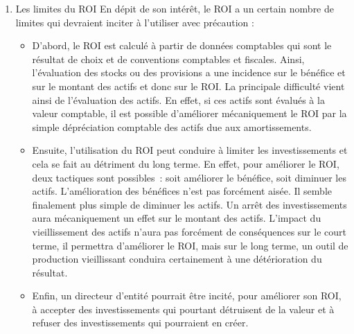 \documentclass{tufte-handout}
\begin{document}
\begin{enumerate}
En résumé, le ROI synthétise "la performance financière des managers ayant la charge de faire face au marché, et maîtrisant pour cela les paramètres qui déterminent les ventes, les coûts et l'actif du bilan"\footnote{Bouquin, H (2010), Le contrôle de gestion, PUF, 8ᵉ édition.\\}. Il permet aussi de transformer l'entreprise en un vaste marché financier interne permettant à la direction d'allouer des ressources aux projets dont les ambitions et la logique financière leur conviennent ; il permet aux dirigeants de garder le contrôle par la logique financière. Il est, en outre, un langage commun assez compréhensible pour l'ensemble de la hiérarchie.\\

Il peut, de plus, être relié directement aux attentes des actionnaires et à la rentabilité financière (que l'on nomme en général ROE : \emph{Return on Equity}), par l'intermédiaire de l'effet de levier, notion que vous verrez dans le cours de finance.\\
\item Les limites du ROI
\label{sec:orga70a6db}
En dépit de son intérêt, le ROI a un certain nombre de limites qui devraient inciter à l'utiliser avec précaution :\\
\begin{itemize}
\item D'abord, le ROI est calculé à partir de données comptables qui sont le résultat de choix et de conventions comptables et fiscales. Ainsi, l'évaluation des stocks ou des provisions a une incidence sur le bénéfice et sur le montant des actifs et donc sur le ROI. La principale difficulté vient ainsi de l'évaluation des actifs. En effet, si ces actifs sont évalués à la valeur comptable, il est possible d'améliorer mécaniquement le ROI par la simple dépréciation comptable des actifs due aux amortissements.\\
\item Ensuite, l'utilisation du ROI peut conduire à limiter les investissements et cela se fait au détriment du long terme. En effet, pour améliorer le ROI, deux tactiques sont possibles : soit améliorer le bénéfice, soit diminuer les actifs. L'amélioration des bénéfices n'est pas forcément aisée. Il semble finalement plus simple de diminuer les actifs. Un arrêt des investissements aura mécaniquement un effet sur le montant des actifs. L'impact du vieillissement des actifs n'aura pas forcément de conséquences sur le court terme, il permettra d'améliorer le ROI, mais sur le long terme, un outil de production vieillissant conduira certainement à une détérioration du résultat.\\
\item Enfin, un directeur d'entité pourrait être incité, pour améliorer son ROI, à accepter des investissements qui pourtant détruisent de la valeur et à refuser des investissements qui pourraient en créer.\\
\end{itemize}


\end{enumerate}
\end{document}
